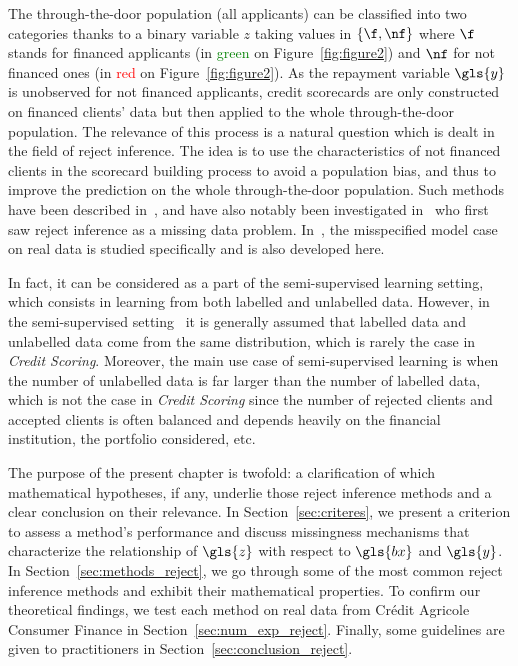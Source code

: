 The through-the-door population (all applicants) can be classified into two categories thanks to a binary variable $z$ taking values in $\{\f,\nf\}$ where $\f$ stands for financed applicants (in \textcolor{green}{green} on Figure~\ref{fig:figure2}) and $\nf$ for not financed ones (in \textcolor{red}{red} on Figure~\ref{fig:figure2}). As the repayment variable $\gls{y}$ is unobserved for not financed applicants, credit scorecards are only constructed on financed clients' data but then applied to the whole  through-the-door population. The relevance of this process is a natural question which is dealt in the field of {reject inference}. The idea is to use the characteristics of not financed clients in the scorecard building process to avoid a population bias, and thus to improve the prediction on the whole through-the-door population. Such methods have been described in~\cite{RI6,saporta,banasik,economix}, and have also notably been investigated in~\cite{RI2} who first saw {reject inference} as a missing data problem. In~\cite{RI3}, the misspecified model case on real data is studied specifically and is also developed here.


In fact, it can be considered as a part of the semi-supervised learning setting, which consists in learning from both labelled and unlabelled data. However, in the semi-supervised setting~\cite{ChaSchZie06} it is generally assumed that labelled data and unlabelled data come from the same distribution, which is rarely the case in \textit{Credit Scoring}. Moreover, the main use case of semi-supervised learning is when the number of unlabelled data is far larger than the number of labelled data, which is not the case in \textit{Credit Scoring} since the number of rejected clients and accepted clients is often balanced and depends heavily on the financial institution, the portfolio considered, etc.


The purpose of the present chapter is twofold: a clarification of which mathematical hypotheses, if any, underlie those reject inference methods and a clear conclusion on their relevance. In Section~\ref{sec:criteres}, we present a criterion to assess a method's performance and discuss missingness mechanisms that characterize the relationship of $\gls{z}$ with respect to $\gls{bx}$ and $\gls{y}$. In Section~\ref{sec:methods_reject}, we go through some of the most common reject inference methods and exhibit their mathematical properties. 
To confirm our theoretical findings, we test each method on real data from Crédit Agricole Consumer Finance in Section~\ref{sec:num_exp_reject}.
Finally, some guidelines are given to practitioners in Section~\ref{sec:conclusion_reject}.

